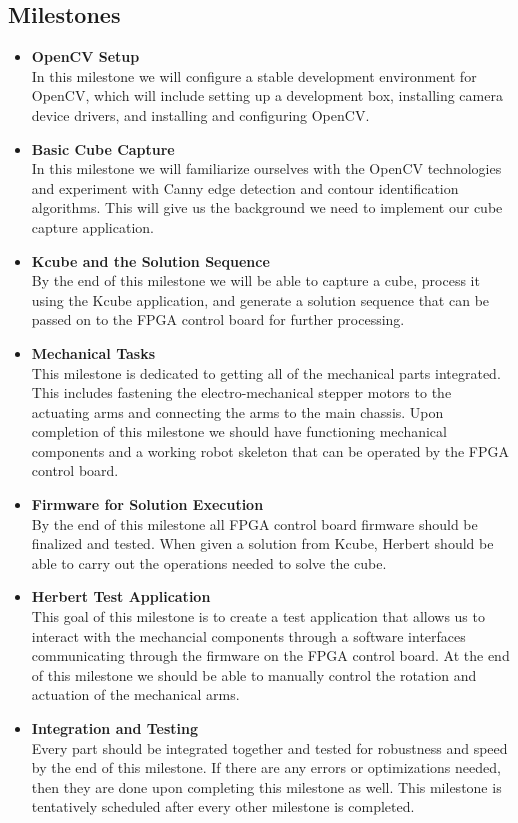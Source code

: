 \documentclass[11pt,english]{article}
\begin{document}
\subsection{Milestones}
\label{sec:Milestones}
\begin{itemize}
  \item {\bf OpenCV Setup} \hfill \\
  In this milestone we will configure a stable development environment for OpenCV, which will include setting up a development box, installing camera device drivers, and installing and configuring OpenCV.

  \item {\bf Basic Cube Capture} \hfill \\
  In this milestone we will familiarize ourselves with the OpenCV technologies and experiment with Canny edge detection and contour identification algorithms. This will give us the background we need to implement our cube capture application.
  \item {\bf Kcube and the Solution Sequence} \hfill \\
  By the end of this milestone we will be able to capture a cube, process it using the Kcube application, and generate a solution sequence that can be passed on to the FPGA control board for further processing.

  \item {\bf Mechanical Tasks} \hfill \\
  This milestone is dedicated to getting all of the mechanical parts integrated. This includes fastening the electro-mechanical stepper motors to the actuating arms and connecting the arms to the main chassis. Upon completion of this milestone we should have functioning mechanical components and a  working robot skeleton that can be operated by the FPGA control board.

  \item {\bf Firmware for Solution Execution} \hfill \\
  By the end of this milestone all FPGA control board firmware should be finalized and tested. When given a solution from Kcube, Herbert should be able to carry out the operations needed to solve the cube.

  \item {\bf Herbert Test Application} \hfill \\
  This goal of this milestone is to create a test application that allows us to interact with the mechancial components through a software interfaces communicating through the firmware on the FPGA control board. At the end of this milestone we should be able to manually control the rotation and actuation of the mechanical arms.

  \item {\bf Integration and Testing} \hfill \\
  Every part should be integrated together and tested for robustness and speed by the end of this milestone. If there are any errors or optimizations needed, then they are done upon completing this milestone as well. This milestone is tentatively scheduled after every other milestone is completed.
\end{itemize}
\end{document}
